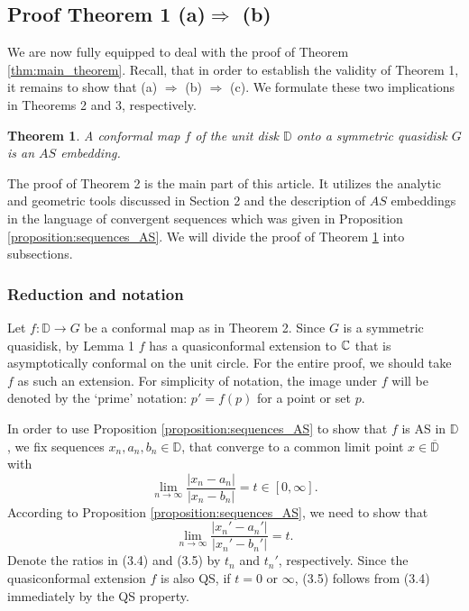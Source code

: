 \documentclass[11pt]{amsart}
\numberwithin{equation}{section}
\theoremstyle{plain}
\newtheorem{thm}{Theorem}
\theoremstyle{step}
\def\Ra{\Rightarrow}
\newcommand{\abs}[1]{\lvert#1\rvert}
\newcommand{\D}{\mathbb{D}}
\newcommand{\C}{\Bbb{C}}
\renewcommand{\bar}[1]{\overline{#1}}
\begin{document}
 
\subsection{Proof Theorem 1 (a)$\Ra$ (b)}
We are now fully equipped to deal with the proof of Theorem \ref{thm:main_theorem}. Recall, that in order to establish the validity of Theorem 1, it remains to show that (a) $\Rightarrow$ (b) $\Rightarrow$ (c). We formulate these two implications in Theorems 2 and 3, respectively. 
\begin{thm}\label{thm:a_ra_b}
    A conformal map $f$ of the unit disk $\D$ onto a symmetric quasidisk $G$ is an $AS$ embedding.
\end{thm}
The proof of Theorem 2 is the main part of this article. It utilizes the analytic and geometric tools discussed in Section 2 and the description of $AS$ embeddings in the language of convergent sequences which was given in Proposition \ref{proposition:sequences_AS}. We will divide the proof of Theorem \ref{thm:a_ra_b} into subsections.


\subsubsection{Reduction and notation}
Let $f: \D\rightarrow G$ be a conformal map as in Theorem 2. Since $G$ is a symmetric quasidisk, by Lemma 1 $f$ has a quasiconformal extension to $\C$ that is asymptotically conformal on the unit circle. For the entire proof, we should take $f$ as such an extension. For simplicity of notation, the image under $f$ will be denoted by the `prime' notation: $p'=f(p)$ for a point or set $p$. 

In order to use Proposition \ref{proposition:sequences_AS} to show that $f$ is AS in $\D$, we fix sequences $x_n,a_n,b_n\in\D$, that converge to a common limit point $x\in\bar\D$ with
\begin{equation}
 \lim_{n\rightarrow\infty}\frac{\abs{x_n-a_n}}{\abs{x_n-b_n}}=t\in [0,\infty].
 \end{equation}
 According to Proposition \ref{proposition:sequences_AS}, we need to show that 
\begin{equation}
 \lim_{n\rightarrow\infty}\frac{\abs{x_n'-a_n'}}{\abs{x_n'-b_n'}}=t.
 \end{equation}
 Denote the ratios in (3.4) and (3.5) by $t_n$ and $t_n'$, respectively. Since the quasiconformal extension $f$ is also QS, if $t=0$ or $\infty$, (3.5) follows from (3.4) immediately by the QS property. 
\end{document}
